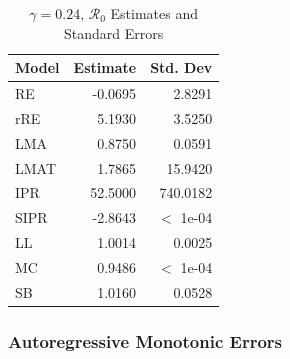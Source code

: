 \documentclass[12pt]{article}
\newcommand{\rr}{\ensuremath{\mathcal{R}_0}}
\begin{document}
\begin{table}[H]
	
	\centering
	\begin{tabular}[t]{l|r|r}
		\hline
		Model & Estimate & Std. Dev\\
		\hline
		RE & -0.0695 & 2.8291\\
		\hline
		rRE & 5.1930 & 3.5250\\
		\hline
		LMA & 0.8750 & 0.0591\\
		\hline
		LMAT & 1.7865 & 15.9420\\
		\hline
		IPR & 52.5000 & 740.0182\\
		\hline
		SIPR & -2.8643 & $<$ 1e-04\\
		\hline
		LL & 1.0014 & 0.0025\\
		\hline
		MC & 0.9486 & $<$ 1e-04\\
		\hline
		SB & 1.0160 & 0.0528\\
		\hline
	\end{tabular}
	\caption{$\gamma = 0.24$, $\rr$ Estimates and Standard Errors}
\end{table}

\subsubsection{Autoregressive Monotonic Errors}
\end{document}
